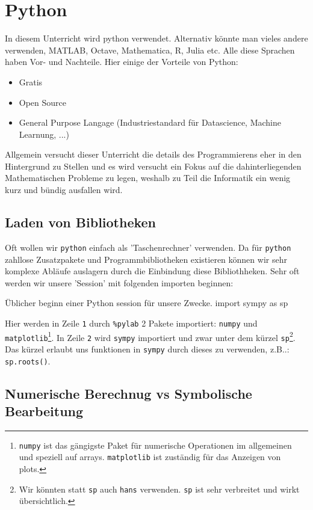 \section{Python}\label{sec:python}

In diesem Unterricht wird python verwendet. Alternativ könnte man vieles andere verwenden, MATLAB, Octave,  Mathematica, R, Julia etc. Alle diese Sprachen haben Vor- und Nachteile. Hier einige der Vorteile von Python:
\begin{itemize}
	\item Gratis
	\item Open Source
	\item General Purpose Langage (Industriestandard für Datascience, Machine Learnung, ...) 
\end{itemize}
Allgemein versucht dieser Unterricht die details des Programmierens eher in den Hintergrund zu Stellen und es wird versucht ein Fokus auf die dahinterliegenden Mathematischen Probleme zu legen, weshalb zu Teil die Informatik ein wenig kurz und bündig ausfallen wird. 

\subsection{Laden von Bibliotheken}
Oft wollen wir \texttt{python} einfach als 'Taschenrechner' verwenden. Da für \texttt{python} zahllose Zusatzpakete und Programmbibliotheken existieren können wir sehr komplexe Abläufe auslagern durch die Einbindung diese Bibliothheken. Sehr oft werden wir unsere 'Session' mit folgenden importen beginnen:

\begin{python}{Üblicher beginn einer Python session für unsere Zwecke.}
import sympy as sp
\end{python}
Hier werden in Zeile \texttt{1} durch \texttt{\%pylab} 2 Pakete importiert: \texttt{numpy} und \texttt{matplotlib}\footnote{\texttt{numpy} ist das gängigste Paket für numerische Operationen im allgemeinen und speziell auf arrays. \texttt{matplotlib} ist zuständig für das Anzeigen von plots.}. In Zeile \texttt{2} wird \texttt{sympy} importiert und zwar unter dem kürzel \texttt{sp}\footnote{Wir könnten statt \texttt{sp} auch \texttt{hans} verwenden. \texttt{sp} ist sehr verbreitet und wirkt übersichtlich.}. Das kürzel erlaubt uns funktionen in \texttt{sympy} durch dieses zu verwenden, z.B..: \texttt{sp.roots()}. \\


\subsection{Numerische Berechnug vs Symbolische Bearbeitung}

